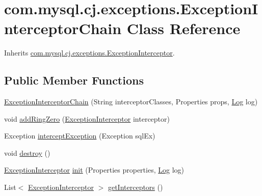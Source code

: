 \hypertarget{classcom_1_1mysql_1_1cj_1_1exceptions_1_1_exception_interceptor_chain}{}\section{com.\+mysql.\+cj.\+exceptions.\+Exception\+Interceptor\+Chain Class Reference}
\label{classcom_1_1mysql_1_1cj_1_1exceptions_1_1_exception_interceptor_chain}


Inherits \mbox{\hyperlink{interfacecom_1_1mysql_1_1cj_1_1exceptions_1_1_exception_interceptor}{com.\+mysql.\+cj.\+exceptions.\+Exception\+Interceptor}}.

\subsection*{Public Member Functions}
\begin{DoxyCompactItemize}
\item 
\mbox{\hyperlink{classcom_1_1mysql_1_1cj_1_1exceptions_1_1_exception_interceptor_chain_a9d0c16583102028171b421ce25df49b5}{Exception\+Interceptor\+Chain}} (String interceptor\+Classes, Properties props, \mbox{\hyperlink{interfacecom_1_1mysql_1_1cj_1_1log_1_1_log}{Log}} log)
\item 
void \mbox{\hyperlink{classcom_1_1mysql_1_1cj_1_1exceptions_1_1_exception_interceptor_chain_a0def64e930fdc316b18f850190198a7a}{add\+Ring\+Zero}} (\mbox{\hyperlink{interfacecom_1_1mysql_1_1cj_1_1exceptions_1_1_exception_interceptor}{Exception\+Interceptor}} interceptor)
\item 
Exception \mbox{\hyperlink{classcom_1_1mysql_1_1cj_1_1exceptions_1_1_exception_interceptor_chain_a78c915d6aa11122e3fd845532ad29eb5}{intercept\+Exception}} (Exception sql\+Ex)
\item 
void \mbox{\hyperlink{classcom_1_1mysql_1_1cj_1_1exceptions_1_1_exception_interceptor_chain_a23c40128c6933d51a1c29055494180db}{destroy}} ()
\item 
\mbox{\hyperlink{interfacecom_1_1mysql_1_1cj_1_1exceptions_1_1_exception_interceptor}{Exception\+Interceptor}} \mbox{\hyperlink{classcom_1_1mysql_1_1cj_1_1exceptions_1_1_exception_interceptor_chain_ae29710eae9d22d426baabd3b2e589fec}{init}} (Properties properties, \mbox{\hyperlink{interfacecom_1_1mysql_1_1cj_1_1log_1_1_log}{Log}} log)
\item 
List$<$ \mbox{\hyperlink{interfacecom_1_1mysql_1_1cj_1_1exceptions_1_1_exception_interceptor}{Exception\+Interceptor}} $>$ \mbox{\hyperlink{classcom_1_1mysql_1_1cj_1_1exceptions_1_1_exception_interceptor_chain_a417b11af060c97c112b0605df727e15b}{get\+Interceptors}} ()
\end{DoxyCompactItemize}


